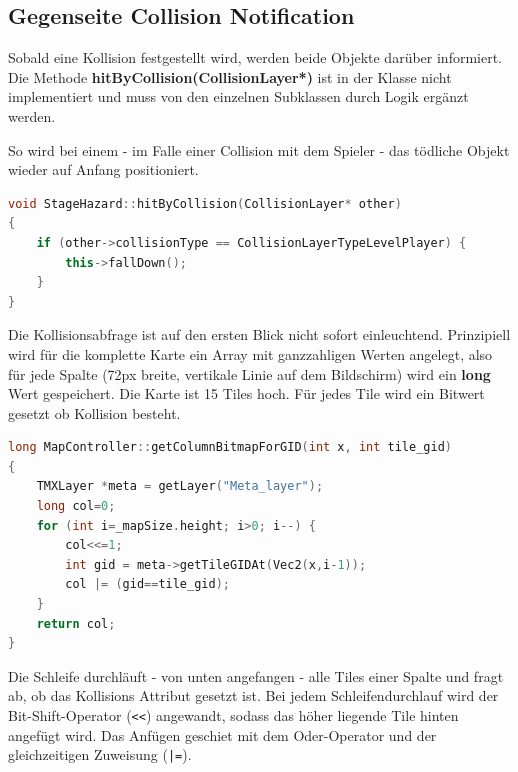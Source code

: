 \subsection{Gegenseite Collision Notification}

Sobald eine Kollision festgestellt wird, werden beide Objekte darüber informiert. Die Methode \textbf{hitByCollision(CollisionLayer*)} ist in der  Klasse nicht implementiert und muss von den einzelnen Subklassen durch Logik ergänzt werden.

So wird bei einem  - im Falle einer Collision mit dem Spieler - das tödliche Objekt wieder auf Anfang positioniert.

\begin{lstlisting}[label=lst:hit_by_collision,
				   language=C++,
				   firstnumber=32,
				   caption=Collision Notification ( StageHazard.cpp )]
void StageHazard::hitByCollision(CollisionLayer* other)
{
	if (other->collisionType == CollisionLayerTypeLevelPlayer) {
		this->fallDown();
	}
}
\end{lstlisting}



\label{sec:4_Kollisionsabfrage}

Die Kollisionsabfrage ist auf den ersten Blick nicht sofort einleuchtend. Prinzipiell wird für die komplette Karte ein Array mit ganzzahligen Werten angelegt, also für jede Spalte (72px breite, vertikale Linie auf dem Bildschirm) wird ein \textbf{long} Wert gespeichert.
Die Karte ist 15 Tiles hoch. Für jedes Tile wird ein Bitwert gesetzt ob Kollision besteht.

\begin{lstlisting}[label=lst:collision_detection,
				   language=C++,
				   firstnumber=271,
				   caption=Collision Column abfragen ( MapController.cpp )]
long MapController::getColumnBitmapForGID(int x, int tile_gid)
{
	TMXLayer *meta = getLayer("Meta_layer");
	long col=0;
	for (int i=_mapSize.height; i>0; i--) {
		col<<=1;
		int gid = meta->getTileGIDAt(Vec2(x,i-1));
		col |= (gid==tile_gid);
	}
	return col;
}
\end{lstlisting}

Die Schleife durchläuft - von unten angefangen - alle Tiles einer Spalte und fragt ab, ob das Kollisions Attribut gesetzt ist. Bei jedem Schleifendurchlauf wird der Bit-Shift-Operator (\texttt{<<}) angewandt, sodass das höher liegende Tile hinten angefügt wird. Das Anfügen geschiet mit dem Oder-Operator und der gleichzeitigen Zuweisung (\texttt{|=}).

